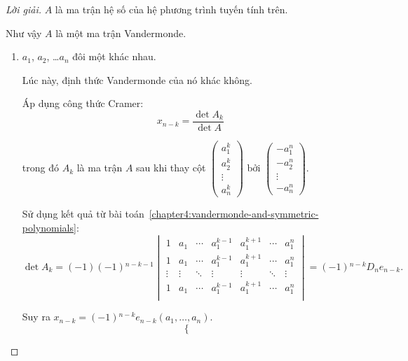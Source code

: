 \documentclass[class=linearalgebra,crop=false]{standalone}
\begin{document}
\begin{proof}[Lời giải]
    \par $A$ là ma trận hệ số của hệ phương trình tuyến tính trên.
    \par Như vậy $A$ là một ma trận Vandermonde.

    \begin{enumerate}[label = \textbf{Trường hợp \arabic*.},itemindent=2cm]
        \item $a_{1}$, $a_{2}$, \ldots $a_{n}$ đôi một khác nhau.
              \par Lúc này, định thức Vandermonde của nó khác không.
              \par Áp dụng công thức Cramer:
              \[
                  x_{n-k} = \dfrac{\det A_{k}}{\det A}
              \]
              \par trong đó $A_{k}$ là ma trận $A$ sau khi thay cột $\begin{pmatrix} a_{1}^{k} \\ a_{2}^{k} \\ \vdots \\ a_{n}^{k} \end{pmatrix}$ bởi $\begin{pmatrix}-a_{1}^{n} \\ -a_{2}^{n} \\ \vdots \\ -a_{n}^{n} \end{pmatrix}$.
              \par Sử dụng kết quả từ bài toán~\ref{chapter4:vandermonde-and-symmetric-polynomials}:
              \[
                  \det A_{k} = (-1)(-1){}^{n-k-1}
                  \begin{vmatrix}
                      1      & a_{1}  & \cdots & a_{1}^{k-1} & a_{1}^{k+1} & \cdots & a_{1}^{n} \\
                      1      & a_{1}  & \cdots & a_{1}^{k-1} & a_{1}^{k+1} & \cdots & a_{1}^{n} \\
                      \vdots & \vdots & \ddots & \vdots      & \vdots      & \ddots & \vdots    \\
                      1      & a_{1}  & \cdots & a_{1}^{k-1} & a_{1}^{k+1} & \cdots & a_{1}^{n} \\
                  \end{vmatrix}
                  = (-1){}^{n-k}D_{n}e_{n-k}.
              \]
              \par Suy ra $x_{n-k} = (-1){}^{n-k}e_{n-k}(a_{1},\ldots, a_{n})$.
              \[
                  \begin{cases}

\end{cases}\]
\end{enumerate}
\end{proof}
\end{document}
